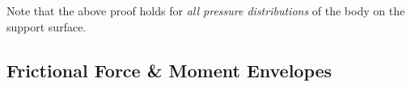 \documentclass[conference]{IEEEtran}
\newtheorem{proposition}{Proposition}
\begin{document}
Note that the above proof holds for \textit{all pressure
  distributions} of the body on the support
surface.



\subsection{Frictional Force \& Moment Envelopes}\label{sec:frictional-envelope}
\end{document}
